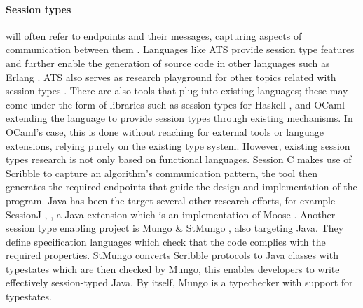 \paragraph{Session types} will often refer to endpoints and their messages, capturing aspects of communication between them \autocite{Honda1993}.
Languages like ATS provide session type features and further enable the generation of source code in other languages
such as Erlang \autocite{Xi2016}. ATS also serves as research playground for other topics related with session types \autocite{Xi2016a}.
There are also tools that plug into existing languages;
these may come under the form of libraries such as session types
for Haskell \autocite[Section 3.3]{Ancona2016}, \autocite[Chapter 10]{Gay2017} and OCaml \autocite[Chapter 11]{Gay2017}
extending the language to provide session types through existing mechanisms.
In OCaml's case, this is done without reaching for external tools or language extensions,
relying purely on the existing type system.
However, existing session types research is not only based on functional languages.
Session C \autocite[Section 4.1]{Ancona2016} makes use of Scribble \autocite{Yoshida2014} to capture an algorithm's communication pattern,
the tool then generates the required endpoints that guide the design and implementation of the program.
Java has been the target several other research efforts, for example SessionJ \autocite[Section 2.2.1]{Ancona2016}, \autocite{Hu2008},
a Java extension which is an implementation of Moose \autocite[Section 2.1.1]{Ancona2016}.
Another session type enabling project is Mungo \& StMungo \autocite{Kouzapas2018, Voinea2020}, also targeting Java.
They define specification languages which check that the code complies with the required properties.
StMungo converts Scribble protocols to Java classes with typestates which are then checked by Mungo,
this enables developers to write effectively session-typed Java.
By itself, Mungo is a typechecker with support for typestates.

